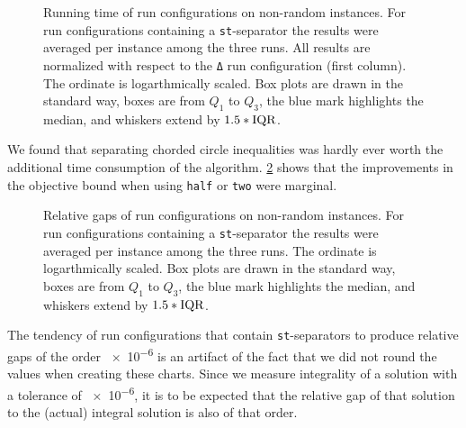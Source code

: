 \begin{figure}[H]
	\centering
	\resizebox{0.95\linewidth}{!}{
	}
	\bigskip
	\caption[Running time on non-random data]{Running time of run configurations on non-random instances.
		For run configurations containing a \texttt{st}-separator the results were averaged per instance among the three runs.
		All results are normalized with respect to the \texttt{Δ} run configuration (first column).
		The ordinate is logarthmically scaled.
		Box plots are drawn in the standard way, \ie boxes are from $Q_{1}$ to $Q_{3}$, the blue mark highlights the median, and whiskers extend by $1.5*\mathit{\text{IQR}}$.}
	\label{fig:non_random_time_bars}
\end{figure}

We found that separating chorded circle inequalities was hardly ever worth the additional time consumption of the algorithm.
\cref{fig:non_random_log_gap_bars} shows that the improvements in the objective bound when using \texttt{half} or \texttt{two} were marginal.

\begin{figure}[H]
	\centering
	\resizebox{0.95\linewidth}{!}{
	}
	\bigskip
	\caption[Relative gaps on non-random data]{Relative gaps of run configurations on non-random instances.
		For run configurations containing a \texttt{st}-separator the results were averaged per instance among the three runs.
		The ordinate is logarthmically scaled.
		Box plots are drawn in the standard way, \ie boxes are from $Q_{1}$ to $Q_{3}$, the blue mark highlights the median, and whiskers extend by $1.5*\mathit{\text{IQR}}$.}
	\label{fig:non_random_log_gap_bars}
\end{figure}

The tendency of run configurations that contain \texttt{st}-separators to produce relative gaps of the order \num{e-6} is an artifact of the fact that we did not round the values when creating these charts.
Since we measure integrality of a solution with a tolerance of \num{e-6}, it is to be expected that the relative gap of that solution to the (actual) integral solution is also of that order.

